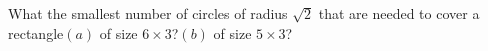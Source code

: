 What the smallest number of circles of radius $\sqrt{2}$ that are needed to cover a rectangle$(a)$ of size $6\times 3$?$(b)$ of size $5\times 3$?